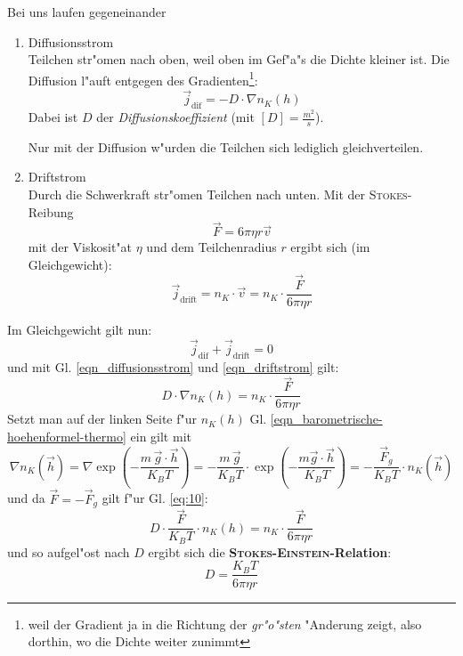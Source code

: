 Bei uns laufen gegeneinander
\begin{enumerate}
\item {}Diffusionsstrom\\Teilchen str"omen nach oben, weil oben im Gef"a"s
   die Dichte kleiner ist. Die Diffusion l"auft entgegen des
   Gradienten\footnote{weil der Gradient ja in die Richtung der
     \emph{gr"o"sten} "Anderung zeigt, also dorthin, wo die Dichte weiter
   zunimmt}:
   \begin{equation}
      \label{eqn_diffusionsstrom}
      \vec j_\text{dif} =  - D \cdot  \nabla n_K(h)
   \end{equation}
   Dabei ist $D$ der
   \emph{Diffusionskoeffizient} (mit $[D]
   = \frac{m^2}{s}$).

   Nur mit der Diffusion w"urden die Teilchen sich lediglich
   gleichverteilen.

\item Driftstrom\\Durch die Schwerkraft str"omen Teilchen nach
   unten. Mit der \textsc{Stokes}-Reibung 
$$
\vec F = 6 \pi \eta r \vec v
$$
mit der Viskosit"at $\eta$ und dem Teilchenradius $r$ ergibt sich (im
Gleichgewicht):
\begin{equation}
   \label{eqn_driftstrom}
   \vec j_\text{drift} = n_K \cdot \vec v = n_K \cdot \frac{\vec
     F}{6\pi\eta r}
\end{equation}
\end{enumerate}
Im Gleichgewicht gilt nun:
$$
\vec j_\text{dif} + \vec j_\text{drift} = 0
$$
und mit Gl. \eqref{eqn_diffusionsstrom} und \eqref{eqn_driftstrom}
gilt:
\begin{equation}
   \label{eq:10}
 D \cdot  \nabla n_K(h) =   n_K \cdot \frac{\vec
     F}{6\pi\eta r}
\end{equation}
Setzt man auf der linken Seite f"ur $n_K(h)$
Gl. \eqref{eqn_barometrische-hoehenformel-thermo} ein gilt mit 
$$
\nabla n_K(\vec h) = \nabla \exp \left ( - \frac{m\, \vec g \cdot \vec
     h}{K_B T} \right ) = - \frac{m\, \vec g}{K_B T} \cdot \exp \left ( -
   \frac{m\vec g \cdot \vec h}{K_B T} \right ) = - \frac{\vec F_g}{K_B
  T} \cdot n_K(\vec h)
$$
und da $\vec F = -\vec F_g$ gilt f"ur Gl. \eqref{eq:10}:
\begin{equation*}
   \label{eq:17}
   D \cdot \frac{\vec F}{K_B T} \cdot n_K(h) =  n_K \cdot \frac{\vec
     F}{6\pi\eta r}
\end{equation*}
und so aufgel"ost nach $D$ ergibt sich die
\textbf{\textsc{Stokes-Einstein}-Relation}:
\begin{equation}
   \label{eqn_stokes-einstein-relation}
   \boxed{   
     D = \frac{K_B T}{6\pi\eta r} 
   }
\end{equation}


